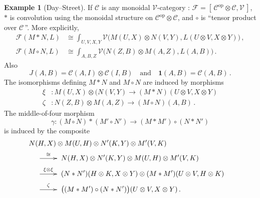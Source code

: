 \documentclass[a4paper,12pt]{article}
\theoremstyle{definition}
\newtheorem{example}{Example}[subsection]
\theoremstyle{fact}
\theoremstyle{genquest}
\theoremstyle{step}
\newcommand{\catI}{\mathbf{1}}
\newcommand{\catC}{\mathcal{C}}
\newcommand{\catF}{\mathcal{F}}
\newcommand{\catV}{\mathcal{V}}
\newcommand{\op}{\operatorname{op}}
\newcommand{\longto}{\longrightarrow}
\begin{document}
\begin{example}[Day--Street] \label{DuoEx5}%
If $\catC$ is any monoidal $\catV$-category : $\catF = [\,\catC^{\op} \otimes \catC,\catV\,]$, 
$\ast$ is convolution using the monoidal structure on $\catC^{\op} \otimes \catC$, 
and $\circ$ is ``tensor product over $\catC\,$''.   
More explicitly, 
\begin{align*}
\catF (M \ast N,L) &\cong \int_{U,V,X,Y} \catV \bigl(M(U,X) \otimes N(V,Y),L(U\otimes V,X\otimes Y)\bigr)\,,
\\
\catF (M\circ N, L) &\cong \int_{A,B,Z} \catV \bigl(N(Z,B) \otimes M(A,Z),L(A,B)\bigr)\,.
\end{align*}
Also
\[
J(A,B) = \catC (A,I) \otimes \catC (I,B) \quad\text{and} \quad
 \catI (A,B) = \catC (A,B)\,.
\]
The isomorphisms defining $M\ast N$ and $M\circ N$ are induced by morphisms
\begin{align*}
\xi &: M(U,X) \otimes (N(V,Y) \longto (M \ast N) (U\otimes V, X \otimes Y)
\\
\zeta &: N(Z,B) \otimes M(A,Z) \longto (M\circ N) (A,B)\,.
\end{align*}
The middle-of-four morphism
\[
\gamma : (M \circ N) \ast (M' \circ N') \longto (M \ast M') \circ (N\ast N')
\]
is induced by the composite
\begin{align*}
\lefteqn{N(H,X)\otimes M(U,H) \otimes N'(K,Y) \otimes M'(V,K)}
\\
&&& \xymatrix{\ar[r]^-{\cong}&}
N(H,X) \otimes N'(K,Y) \otimes M(U,H) \otimes M'(V,K) 
\\
&&&\xymatrix{\ar[r]^-{\xi \otimes \xi}&}
(N\ast N') (H \otimes K, X \otimes Y) \otimes (M\ast M') (U \otimes V,H \otimes K) 
\\
&&&\xymatrix{\ar[r]^-{\zeta}&} 
 \bigl((M\ast M')\circ (N \ast N')\bigr) (U \otimes V, X \otimes Y)\,.
\end{align*}
\end{example} 
\end{document}
